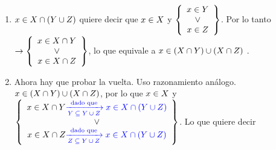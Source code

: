 \documentclass[12pt,a4paper, spanish]{article}
\begin{document}
\begin{enumerate}[label=\arabic*)]
	\item
	      $x \en X \inter (Y \union Z)$ quiere decir que $x \en X$ y
	      $\llaves{c}{
			      x \en Y \\
			      \o      \\
			      x \en Z
		      } $.
	      Por lo tanto $\to
		      \llaves{c}{
			      x \en X \inter Y\\
			      \o \\
			      x \en X \inter Z
		      }$, lo que equivale a $x \en (X \inter Y) \union (X \inter Z)$ \checkmark.\\

	\item
	      Ahora hay que probar la vuelta. Uso razonamiento análogo.
	      $x \en (X \inter Y) \union (X \inter Z)$, por lo que $x \en X$ y
	      $
		      \llaves{c}{
			      x \en X \inter Y \blue{$\flecha{dado que}[$Y \subseteq Y \union Z$] x \en X \inter (Y \union Z) $}\\
			      \o               \\
			      x \en X \inter Z \blue{$\flecha{dado que}[$Z \subseteq Y \union Z$] x \en X \inter (Y \union Z)$}
		      }$.
	      Lo que quiere decir \\
	      \\

\end{enumerate}
\end{document}
